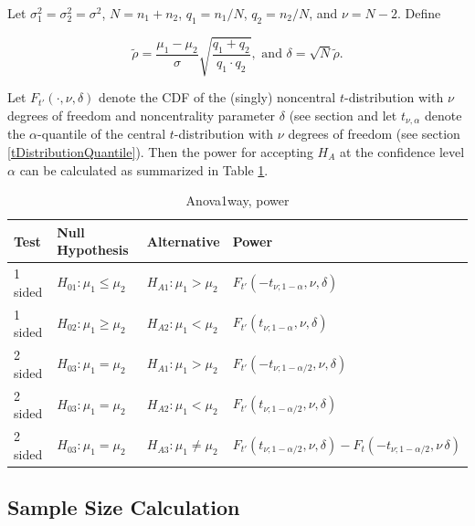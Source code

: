 \vspace{0.3cm}
Let $\sigma_1^2 = \sigma_2^2 = \sigma^2$, $N = n_1 + n_2$, $q_1 = n_1 /N$, $q_2 = n_2 /N$, and $\nu=N-2$. Define

\begin{equation} \label{eq:Anova1wayPower}
	\widetilde{\rho} = \frac{\mu_1-\mu_2}{\sigma} \sqrt{\frac{q_1+q_2}{q_1 \cdot q_2}}, \text{ and } \delta = \sqrt{N} \widetilde{\rho}.
\end{equation}


Let $F_{t'}\left(\cdot, \nu, \delta \right)$ denote the CDF of the (singly) noncentral $t$-distribution with $\nu$ degrees of freedom and noncentrality parameter $\delta$ (see section 
and let $t_{\nu,\alpha}$ denote the $\alpha$-quantile of the central $t$-distribution with $\nu$ degrees of freedom (see section \ref{tDistributionQuantile}).
Then the power for accepting $H_A$ at the confidence level $\alpha$ can be calculated as summarized in Table \ref{TableAnova1way,power}.


\begin{table}[ht]
	\centering
	\begin{tabular}{|l|l|l|l|}
		\hline
		Test &Null Hypothesis &Alternative & Power \\
		\hline
		1 sided & $H_{01}: \mu_1 \leq \mu_2$ & $H_{A1}: \mu_1 > \mu_2$ & $F_{t'}\left(-t_{\nu;1-\alpha}, \nu, \delta \right)$ \\
		1 sided & $H_{02}: \mu_1 \geq \mu_2$ & $H_{A2}: \mu_1 < \mu_2$ & $F_{t'}\left(t_{\nu;1-\alpha}, \nu, \delta \right)$  \\
		\hline
		2 sided & $H_{03}: \mu_1 = \mu_2$ & $H_{A1}: \mu_1 > \mu_2$ & $F_{t'}\left(-t_{\nu;1-\alpha/2}, \nu, \delta \right)$ \\
		2 sided & $H_{03}: \mu_1 = \mu_2$ & $H_{A2}: \mu_1 < \mu_2$ & $F_{t'}\left(t_{\nu;1-\alpha/2}, \nu, \delta \right)$  \\
		2 sided & $H_{03}: \mu_1 = \mu_2$ & $H_{A3}: \mu_1 \neq \mu_2$ & $F_{t'}\left(t_{\nu;1-\alpha/2}, \nu, \delta \right)-F_t\left(-t_{\nu;1-\alpha/2}, \nu\, \delta \right)$ \\
		\hline
	\end{tabular}
	\caption{Anova1way, power}
	\label{TableAnova1way,power}
\end{table}



\newpage
\subsection{Sample Size Calculation}

